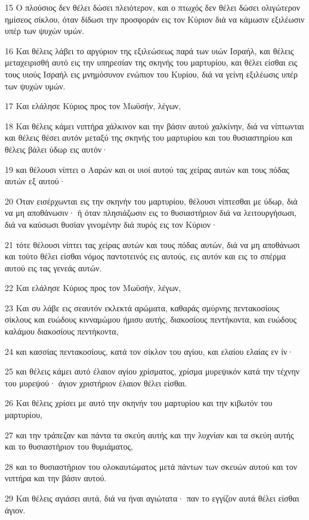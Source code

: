 \par 15 Ο πλούσιος δεν θέλει δώσει πλειότερον, και ο πτωχός δεν θέλει δώσει ολιγώτερον ημίσεος σίκλου, όταν δίδωσι την προσφοράν εις τον Κύριον διά να κάμωσιν εξιλέωσιν υπέρ των ψυχών υμών.
\par 16 Και θέλεις λάβει το αργύριον της εξιλεώσεως παρά των υιών Ισραήλ, και θέλεις μεταχειρισθή αυτό εις την υπηρεσίαν της σκηνής του μαρτυρίου, και θέλει είσθαι εις τους υιούς Ισραήλ εις μνημόσυνον ενώπιον του Κυρίου, διά να γείνη εξιλέωσις υπέρ των ψυχών υμών.
\par 17 Και ελάλησε Κύριος προς τον Μωϋσήν, λέγων,
\par 18 Και θέλεις κάμει νιπτήρα χάλκινον και την βάσιν αυτού χαλκίνην, διά να νίπτωνται και θέλεις θέσει αυτόν μεταξύ της σκηνής του μαρτυρίου και του θυσιαστηρίου και θέλεις βάλει ύδωρ εις αυτόν·
\par 19 και θέλουσι νίπτει ο Ααρών και οι υιοί αυτού τας χείρας αυτών και τους πόδας αυτών εξ αυτού·
\par 20 Όταν εισέρχωνται εις την σκηνήν του μαρτυρίου, θέλουσι νίπτεσθαι με ύδωρ, διά να μη αποθάνωσιν· ή όταν πλησιάζωσιν εις το θυσιαστήριον διά να λειτουργήσωσι, διά να καύσωσι θυσίαν γινομένην διά πυρός εις τον Κύριον·
\par 21 τότε θέλουσι νίπτει τας χείρας αυτών και τους πόδας αυτών, διά να μη αποθάνωσι και τούτο θέλει είσθαι νόμος παντοτεινός εις αυτούς, εις αυτόν και εις το σπέρμα αυτού εις τας γενεάς αυτών.
\par 22 Και ελάλησε Κύριος προς τον Μωϋσήν, λέγων,
\par 23 Και συ λάβε εις σεαυτόν εκλεκτά αρώματα, καθαράς σμύρνης πεντακοσίους σίκλους και ευώδους κινναμώμου ήμισυ αυτής, διακοσίους πεντήκοντα, και ευώδους καλάμου διακοσίους πεντήκοντα,
\par 24 και κασσίας πεντακοσίους, κατά τον σίκλον του αγίου, και ελαίου ελαίας εν ίν·
\par 25 και θέλεις κάμει αυτό έλαιον αγίου χρίσματος, χρίσμα μυρεψικόν κατά την τέχνην του μυρεψού· άγιον χριστήριον έλαιον θέλει είσθαι.
\par 26 Και θέλεις χρίσει με αυτό την σκηνήν του μαρτυρίου και την κιβωτόν του μαρτυρίου,
\par 27 και την τράπεζαν και πάντα τα σκεύη αυτής και την λυχνίαν και τα σκεύη αυτής και το θυσιαστήριον του θυμιάματος,
\par 28 και το θυσιαστήριον του ολοκαυτώματος μετά πάντων των σκευών αυτού και τον νιπτήρα και την βάσιν αυτού.
\par 29 Και θέλεις αγιάσει αυτά, διά να ήναι αγιώτατα· παν το εγγίζον αυτά θέλει είσθαι άγιον.
